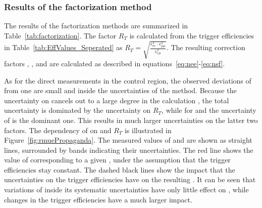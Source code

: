 \subsubsection{Results of the factorization method}
The results of the factorization methods are summarized in Table~\ref{tab:factorization}. The factor $R_T$ is calculated from the trigger efficiencies in Table~\ref{tab:EffValues_Seperated} as $R_T = \sqrt{\frac{\epsilon_{ee}^{T}\cdot\epsilon_{\mu\mu}^{T} }{\epsilon_{e\mu}^{T}}}$. The resulting correction factors \Rsfof, \Reeof, and \Rmmof are calculated as described in equations~\ref{eq:nee}-\ref{eq:nsf}.  

As for the direct measurements in the control region, the observed deviations of \Rsfof from one are small and inside the uncertainties of the method. Because the uncertainty on \rmue cancels out to a large degree in the calculation \Rsfof, the total uncertainty is dominated by the uncertainty on $R_T$, while for \Reeof and \Rmmof the uncertainty of \rmue is the dominant one. This results in much larger uncertainties on the latter two factors. The dependency of \Rsfof on \rmue and $R_T$ is illustrated in Figure~\ref{fig:rmuePropaganda}. The measured values of \rmue and \Rsfof are shown as straight lines, surrounded by bands indicating their uncertainties. The red line shows the value of \Rsfof corresponding to a given \rmue, under the assumption that the trigger efficiencies stay constant. The dashed black lines show the impact that the uncertainties on the trigger efficiencies have on the resulting \Rsfof. It can be seen that variations of \rmue inside its systematic uncertainties have only little effect on \Rsfof, while changes in the trigger efficiencies have a much larger impact. 


